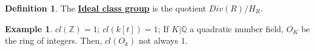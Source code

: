 \documentclass{article}
\theoremstyle{definition}
\theoremstyle{definition}
\theoremstyle{definition}
\theoremstyle{definition}
\theoremstyle{definition}
\newtheorem{definition}{Definition}[section]
\theoremstyle{definition}
\theoremstyle{definition}
\newtheorem{example}{Example}[section]
\begin{document}
\begin{tcolorbox}[colback=purple!5!white,colframe=purple!75!black]
\begin{definition}
The \underline{\textbf{Ideal class group}} is the quotient $Div(R)/H_R$. 
\end{definition}
\end{tcolorbox}

\begin{tcolorbox}[colback=yellow!5!white,colframe=yellow!30!white]
\begin{example}
$cl(\mathbb{Z})=1$; $cl(k[t])=1$; If $K|\mathbb{Q}$ a quadratic number field, $O_K$ be the ring of integers. Then, $cl(O_k)$ not always $1$. 
\end{example}
\end{tcolorbox}
\end{document}
